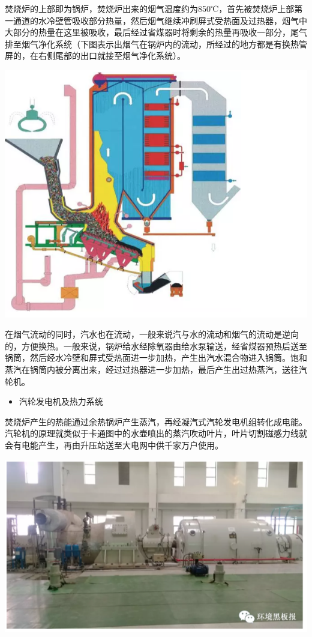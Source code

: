 \documentclass[]{book}
\providecommand{\tightlist}{%
  \setlength{\itemsep}{0pt}\setlength{\parskip}{0pt}}
\begin{document}
焚烧炉的上部即为锅炉，焚烧炉出来的烟气温度约为850℃，首先被焚烧炉上部第一通道的水冷壁管吸收部分热量，然后烟气继续冲刷屏式受热面及过热器，烟气中大部分的热量在这里被吸收，最后经过省煤器时将剩余的热量再吸收一部分，尾气排至烟气净化系统（下图表示出烟气在锅炉内的流动，所经过的地方都是有换热管屏的，在右侧尾部的出口就接至烟气净化系统）。

\includegraphics[width=8.33in]{images/ljfs5}

在烟气流动的同时，汽水也在流动，一般来说汽与水的流动和烟气的流动是逆向的，方便换热。一般来说，锅炉给水经除氧器由给水泵输送，经省煤器预热后送至锅筒，然后经水冷壁和屏式受热面进一步加热，产生出汽水混合物进入锅筒。饱和蒸汽在锅筒内被分离出来，经过过热器进一步加热，最后产生出过热蒸汽，送往汽轮机。

\begin{itemize}
\tightlist
\item
  汽轮发电机及热力系统
\end{itemize}

焚烧炉产生的热能通过余热锅炉产生蒸汽，再经凝汽式汽轮发电机组转化成电能。汽轮机的原理就类似于卡通图中的水壶喷出的蒸汽吹动叶片，叶片切割磁感力线就会有电能产生，再由升压站送至大电网中供千家万户使用。

\includegraphics[width=8.33in]{images/ljfs6}
\end{document}
